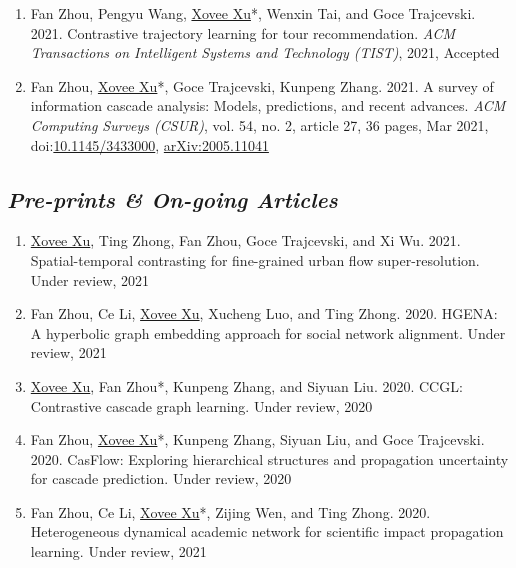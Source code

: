 \begin{enumerate}[resume]
    \item Fan Zhou, Pengyu Wang, \underline{Xovee Xu}*, Wenxin Tai, and Goce Trajcevski. 2021. Contrastive trajectory learning for tour recommendation. \textit{ACM Transactions on Intelligent Systems and Technology (TIST)}, 2021, Accepted
    \item Fan Zhou, \underline{Xovee Xu}*, Goce Trajcevski, Kunpeng Zhang. 2021. A survey of information cascade analysis: Models, predictions, and recent advances. \textit{ACM Computing Surveys (CSUR)}, vol. 54, no. 2, article 27, 36 pages, Mar 2021, doi:\href{https://xovee.cn/html/paper-redirects/csur2021.html}{10.1145/3433000}, \href{https://arxiv.org/abs/2005.11041}{arXiv:2005.11041}
\end{enumerate}

\subsection*{\textnormal{\textit{Pre-prints \& On-going Articles}}}

\begin{enumerate}[resume]
    \item \underline{Xovee Xu}, Ting Zhong, Fan Zhou, Goce Trajcevski, and Xi Wu. 2021. Spatial-temporal contrasting for fine-grained urban flow super-resolution. Under review, 2021
    \item Fan Zhou, Ce Li, \underline{Xovee Xu}, Xucheng Luo, and Ting Zhong. 2020. HGENA: A hyperbolic graph embedding approach for social network alignment. Under review, 2021
    \item \underline{Xovee Xu}, Fan Zhou*, Kunpeng Zhang, and Siyuan Liu. 2020. CCGL: Contrastive cascade graph learning. Under review, 2020
    \item Fan Zhou, \underline{Xovee Xu}*, Kunpeng Zhang, Siyuan Liu, and Goce Trajcevski. 2020. CasFlow: Exploring hierarchical structures and propagation uncertainty for cascade prediction. Under review, 2020
    \item Fan Zhou, Ce Li, \underline{Xovee Xu}*, Zijing Wen, and Ting Zhong. 2020. Heterogeneous dynamical academic network for scientific impact propagation learning. Under review, 2021
\end{enumerate}